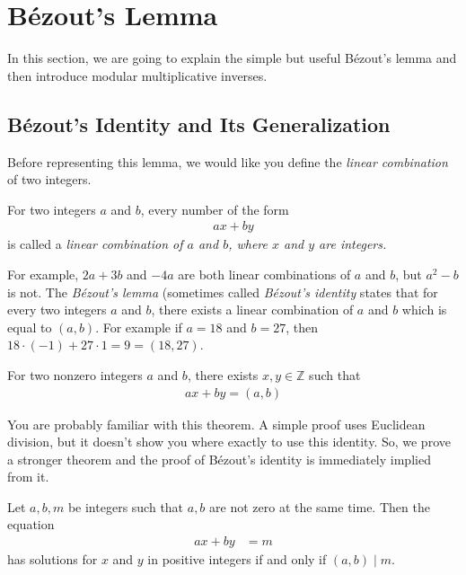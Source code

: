 \section{B\'{e}zout's Lemma}

In this section, we are going to explain the simple but useful B\'{e}zout's lemma and then introduce modular multiplicative inverses.

\subsection{B\'{e}zout's Identity and Its Generalization}
Before representing this lemma, we would like you define the \textit{linear combination} of two integers.

\begin{definition}\label{def:linearcombination}
	For two integers $a$ and $b$, every number of the form
	\begin{align*} ax+by\end{align*}
	is called a \itshape{linear combination} of $a$ and $b$, where $x$ and $y$ are integers.
\end{definition}

For example, $2a+3b$ and $-4a$ are both linear combinations of $a$ and $b$, but $a^2-b$ is not. The \textit{B\'{e}zout's lemma} (sometimes called \textit{B\'{e}zout's identity} states that for every two integers $a$ and $b$, there exists a linear combination of $a$ and $b$ which is equal to $(a,b)$. For example if $a=18$ and $b=27$, then $18 \cdot (-1) + 27 \cdot 1 = 9 =(18,27)$.

\begin{theorem} 
	For two nonzero integers $a$ and $b$, there exists $x, y \in \mathbb Z$ such that
	\begin{align*}
	ax+by = (a,b)
	\end{align*}
\end{theorem}

You are probably familiar with this theorem. A simple proof uses Euclidean division, but it doesn't show you where exactly to use this identity. So, we prove a stronger theorem and the proof of B\'{e}zout's identity is immediately implied from it.

\begin{theorem}\label{thm:equationgcd}
	Let $a,b,m$ be integers such that $a, b$ are not zero at the same time. Then the equation
	\begin{align*}
		ax + by
			& = m
	\end{align*}
	has solutions for $x$ and $y$ in positive integers if and only if $(a,b)\mid m$.
\end{theorem}

